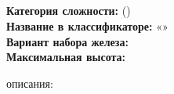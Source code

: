 \begin{samepage}
  \section{\routeTitle}
  \noindent \textbf{Категория сложности:} \routeCategory (\routeType)\\
  \noindent \textbf{Название в классификаторе:} «\routeName»\\
  \noindent \textbf{Вариант набора железа:} \routeEquipment\\
  \noindent \textbf{Максимальная высота: } 

  \hspace{1em}
\end{samepage}


\routeDescription{}
\nopagebreak[4]
\hfill { описания: \routeAuthors}
